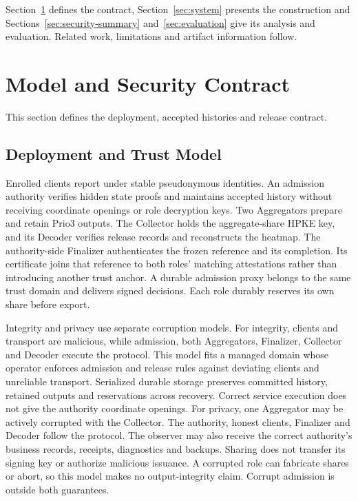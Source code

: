 \documentclass[conference,compsoc]{IEEEtran}
\theoremstyle{definition}
\numberwithin{equation}{section}
\numberwithin{table}{section}
\numberwithin{figure}{section}
\theoremstyle{plain}
\begin{document}
Section~\ref{sec:prelim} defines the contract, Section~\ref{sec:system}
presents the construction and Sections~\ref{sec:security-summary}
and~\ref{sec:evaluation} give its analysis and evaluation. Related work,
limitations and artifact information follow.

\section{Model and Security Contract}
\label{sec:prelim}

This section defines the deployment, accepted histories and release contract.
\subsection{Deployment and Trust Model}
\label{sec:threat}

Enrolled clients report under stable pseudonymous identities. An admission
authority verifies hidden state proofs and maintains accepted history without
receiving coordinate openings or role decryption keys. Two Aggregators prepare
and retain Prio3 outputs. The Collector holds the aggregate-share HPKE key,
and its Decoder verifies release records and reconstructs the heatmap. The
authority-side Finalizer authenticates the frozen reference and its completion.
Its certificate joins that reference to both roles' matching attestations
rather than introducing another trust anchor. A durable admission proxy
belongs to the same trust domain and delivers signed decisions. Each role
durably reserves its own share before export.

Integrity and privacy use separate corruption models. For integrity, clients
and transport are malicious, while admission, both Aggregators, Finalizer,
Collector and Decoder execute the protocol. This model fits a managed domain
whose operator enforces admission and release rules against deviating clients
and unreliable transport. Serialized durable storage preserves committed
history, retained outputs and reservations across recovery. Correct service
execution does not give the authority coordinate openings. For privacy, one
Aggregator may be actively corrupted with the
Collector. The authority, honest clients, Finalizer and Decoder follow the
protocol. The observer may also receive the correct authority's business records,
receipts, diagnostics and backups. Sharing does
not transfer its signing key or authorize malicious issuance. A corrupted
role can fabricate shares or abort, so this model makes no output-integrity
claim. Corrupt admission is outside both guarantees.
\end{document}
